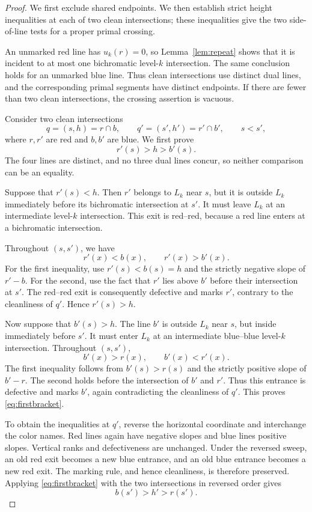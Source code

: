 \documentclass[12pt]{article}
\begin{document}
\begin{proof}
We first exclude shared endpoints. We then establish strict height
inequalities at each of two clean intersections; these inequalities
give the two side-of-line tests for a proper primal crossing.

An unmarked red line has \(u_k(r)=0\), so
Lemma~\ref{lem:repeat} shows that it is incident to at most one
bichromatic level-\(k\) intersection. The same conclusion holds
for an unmarked blue line. Thus clean intersections use distinct
dual lines, and the corresponding primal segments have distinct
endpoints. If there are fewer than two clean intersections, the
crossing assertion is vacuous.

Consider two clean intersections
\[
 q=(s,h)=r\cap b,
 \qquad
 q'=(s',h')=r'\cap b',
 \qquad s<s',
\]
where \(r,r'\) are red and \(b,b'\) are blue. We first prove
\begin{equation}
 r'(s)>h>b'(s).
 \label{eq:firstbracket}
\end{equation}
The four lines are distinct, and no three dual lines concur, so
neither comparison can be an equality.

Suppose that \(r'(s)<h\). Then \(r'\) belongs to \(L_k\) near
\(s\), but it is outside \(L_k\) immediately before its
bichromatic intersection at \(s'\). It must leave \(L_k\) at
an intermediate level-\(k\) intersection. This exit is red--red,
because a red line enters at a bichromatic intersection.

Throughout \((s,s')\), we have
\[
 r'(x)<b(x),
 \qquad
 r'(x)>b'(x).
\]
For the first inequality, use \(r'(s)<b(s)=h\) and the strictly
negative slope of \(r'-b\). For the second, use the fact that
\(r'\) lies above \(b'\) before their intersection at \(s'\).
The red--red exit is consequently defective and marks \(r'\),
contrary to the cleanliness of \(q'\). Hence \(r'(s)>h\).

Now suppose that \(b'(s)>h\). The line \(b'\) is outside \(L_k\)
near \(s\), but inside immediately before \(s'\). It must enter
\(L_k\) at an intermediate blue--blue level-\(k\) intersection.
Throughout \((s,s')\),
\[
 b'(x)>r(x),
 \qquad
 b'(x)<r'(x).
\]
The first inequality follows from \(b'(s)>r(s)\) and the strictly
positive slope of \(b'-r\). The second holds before the
intersection of \(b'\) and \(r'\). Thus this entrance is
defective and marks \(b'\), again contradicting the cleanliness
of \(q'\). This proves \eqref{eq:firstbracket}.

To obtain the inequalities at \(q'\), reverse the horizontal
coordinate and interchange the color names. Red lines again have
negative slopes and blue lines positive slopes. Vertical ranks
and defectiveness are unchanged. Under the reversed sweep, an old
red exit becomes a new blue entrance, and an old blue entrance
becomes a new red exit. The marking rule, and hence cleanliness,
is therefore preserved. Applying \eqref{eq:firstbracket} with the
two intersections in reversed order gives
\begin{equation}
 b(s')>h'>r(s').
 \label{eq:secondbracket}
\end{equation}


\end{proof}
\end{document}
